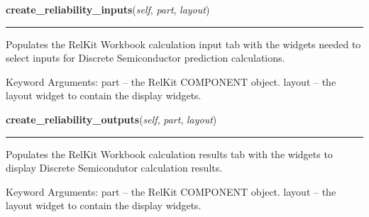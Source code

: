     \label{reliafree:semiconductors:semiconductor:Semiconductor:create_reliability_inputs}

    \vspace{0.5ex}

\hspace{.8\funcindent}\begin{boxedminipage}{\funcwidth}

    \raggedright \textbf{create\_reliability\_inputs}(\textit{self}, \textit{part}, \textit{layout})

    \vspace{-1.5ex}

    \rule{\textwidth}{0.5\fboxrule}
\setlength{\parskip}{2ex}
    Populates the RelKit Workbook calculation input tab with the widgets
    needed to select inputs for Discrete Semiconductor prediction 
    calculations.

    Keyword Arguments: part   -- the RelKit COMPONENT object. layout -- 
    the layout widget to contain the display widgets.

\setlength{\parskip}{1ex}
    \end{boxedminipage}

    \label{reliafree:semiconductors:semiconductor:Semiconductor:create_reliability_outputs}

    \vspace{0.5ex}

\hspace{.8\funcindent}\begin{boxedminipage}{\funcwidth}

    \raggedright \textbf{create\_reliability\_outputs}(\textit{self}, \textit{part}, \textit{layout})

    \vspace{-1.5ex}

    \rule{\textwidth}{0.5\fboxrule}
\setlength{\parskip}{2ex}
    Populates the RelKit Workbook calculation results tab with the 
    widgets to display Discrete Semicondutor calculation results.

    Keyword Arguments: part   -- the RelKit COMPONENT object. layout -- 
    the layout widget to contain the display widgets.

\setlength{\parskip}{1ex}
    \end{boxedminipage}

